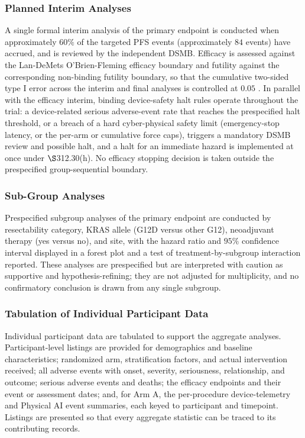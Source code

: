 \subsubsection{Planned Interim Analyses}

A single formal interim analysis of the primary endpoint is conducted when
approximately $60\%$ of the targeted PFS events (approximately $84$ events) have
accrued, and is reviewed by the independent DSMB. Efficacy is assessed against the
Lan-DeMets O'Brien-Fleming efficacy boundary and futility against the corresponding
non-binding futility boundary, so that the cumulative two-sided type I error across
the interim and final analyses is controlled at $0.05$
\cite{DeMets1994lan,Jennison2000group}. In parallel with the efficacy interim, binding
device-safety halt rules operate throughout the trial: a device-related serious
adverse-event rate that reaches the prespecified halt threshold, or a breach of a hard
cyber-physical safety limit (emergency-stop latency, or the per-arm or cumulative
force caps), triggers a mandatory DSMB review and possible halt, and a halt for an
immediate hazard is implemented at once under $\S$312.30(h). No efficacy stopping
decision is taken outside the prespecified group-sequential boundary.

\subsubsection{Sub-Group Analyses}

Prespecified subgroup analyses of the primary endpoint are conducted by resectability
category, KRAS allele (G12D versus other G12), neoadjuvant therapy (yes versus no),
and site, with the hazard ratio and $95\%$ confidence interval displayed in a forest
plot and a test of treatment-by-subgroup interaction reported. These analyses are
prespecified but are interpreted with caution as supportive and hypothesis-refining;
they are not adjusted for multiplicity, and no confirmatory conclusion is drawn from
any single subgroup.

\subsubsection{Tabulation of Individual Participant Data}

Individual participant data are tabulated to support the aggregate analyses.
Participant-level listings are provided for demographics and baseline characteristics;
randomized arm, stratification factors, and actual intervention received; all adverse
events with onset, severity, seriousness, relationship, and outcome; serious adverse
events and deaths; the efficacy endpoints and their event or assessment dates; and,
for Arm A, the per-procedure device-telemetry and Physical AI event summaries, each
keyed to participant and timepoint. Listings are presented so that every aggregate
statistic can be traced to its contributing records.

